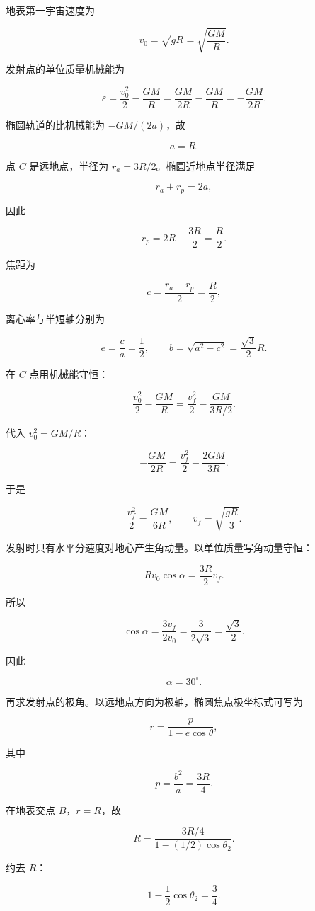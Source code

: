 \documentclass[12pt,a4paper,UTF8]{ctexart}
\begin{document}
地表第一宇宙速度为

\[
v_0=\sqrt{gR}=\sqrt{\frac{GM}{R}}.
\]

发射点的单位质量机械能为

\[
\varepsilon
=\frac{v_0^2}{2}-\frac{GM}{R}
=\frac{GM}{2R}-\frac{GM}{R}
=-\frac{GM}{2R}.
\]

椭圆轨道的比机械能为 \(-GM/(2a)\)，故

\[
a=R.
\]

点 \(C\) 是远地点，半径为 \(r_a=3R/2\)。椭圆近地点半径满足

\[
r_a+r_p=2a,
\]

因此

\[
r_p=2R-\frac{3R}{2}=\frac{R}{2}.
\]

焦距为

\[
c=\frac{r_a-r_p}{2}=\frac{R}{2},
\]

离心率与半短轴分别为

\[
e=\frac{c}{a}=\frac12,
\qquad
b=\sqrt{a^2-c^2}=\frac{\sqrt3}{2}R.
\]

在 \(C\) 点用机械能守恒：

\[
\frac{v_0^2}{2}-\frac{GM}{R}
=\frac{v_f^2}{2}-\frac{GM}{3R/2}.
\]

代入 \(v_0^2=GM/R\)：

\[
-\frac{GM}{2R}
=\frac{v_f^2}{2}-\frac{2GM}{3R}.
\]

于是

\[
\frac{v_f^2}{2}=\frac{GM}{6R},
\qquad
\boxed{v_f=\sqrt{\frac{gR}{3}}}.
\]

发射时只有水平分速度对地心产生角动量。以单位质量写角动量守恒：

\[
Rv_0\cos\alpha=\frac{3R}{2}v_f.
\]

所以

\[
\cos\alpha
=\frac{3v_f}{2v_0}
=\frac{3}{2\sqrt3}
=\frac{\sqrt3}{2}.
\]

因此

\[
\boxed{\alpha=30^\circ}.
\]

再求发射点的极角。以远地点方向为极轴，椭圆焦点极坐标式可写为

\[
r=\frac{p}{1-e\cos\theta},
\]

其中

\[
p=\frac{b^2}{a}=\frac{3R}{4}.
\]

在地表交点 \(B\)，\(r=R\)，故

\[
R=\frac{3R/4}{1-(1/2)\cos\theta_2}.
\]

约去 \(R\)：

\[
1-\frac12\cos\theta_2=\frac34.
\]
\end{document}
